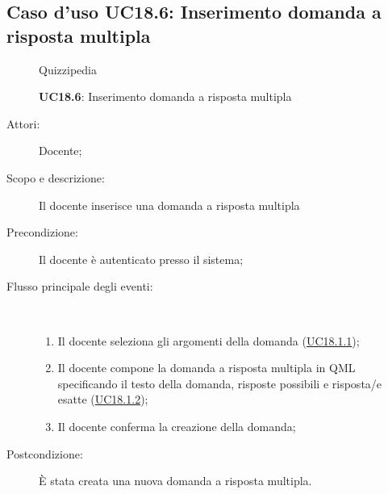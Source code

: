 \subsection{Caso d'uso UC18.6: Inserimento domanda a risposta multipla}
	\begin{figure}[H]
		\centering
		\begin{resizedtikzpicture}{\textwidth}
		\begin{umlsystem}[x=0, fill=lightgray!20]{Quizzipedia}
		\end{umlsystem}
		\end{resizedtikzpicture}
		\caption{\textbf{UC18.6}: Inserimento domanda a risposta multipla}
		\label{UC18.6}
	\end{figure}
\begin{description}
\item[Attori:] Docente;
\item[Scopo e descrizione:] Il docente inserisce una domanda a risposta multipla
      \item[Precondizione:] Il docente è autenticato presso il sistema;

        \item[Flusso principale degli eventi:] \ 
 \begin{enumerate}
          \item Il docente seleziona gli argomenti della domanda (\hyperlink{UC18.1.1}{UC18.1.1});
          \item Il docente compone la domanda a risposta multipla in QML specificando il testo della domanda, risposte possibili e risposta/e esatte (\hyperlink{UC18.1.2}{UC18.1.2});
          \item Il docente conferma la creazione della domanda;

      \end{enumerate}
    \item[Postcondizione:] È stata creata una nuova domanda a risposta multipla.
  \end{description}
\hypertarget{UC18.7}{}

